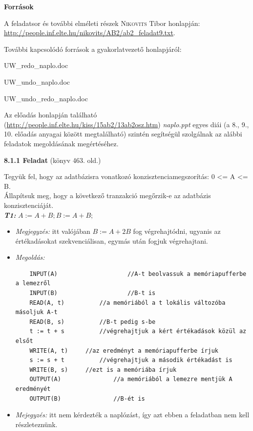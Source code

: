 \documentclass[a4paper,11.5pt, table]{article}
\begin{document}
	{\large \textbf{Források}}
	\begin{compactitem}
	\item A feladatsor és további elméleti részek \textsc{Nikovits} Tibor honlapján: \url{http://people.inf.elte.hu/nikovits/AB2/ab2_feladat9.txt}.
	
	\item További kapcsolódó források a gyakorlatvezető honlapjáról:
	\begin{compactitem}
		\item UW\_redo\_naplo.doc
		\item UW\_undo\_naplo.doc
		\item UW\_undo\_redo\_naplo.doc
	\end{compactitem}
	
	\item Az előadás honlapján található (\url{http://people.inf.elte.hu/kiss/15ab2/13ab2osz.htm}) \textit{naplo.ppt} egyes diái (a 8., 9., 10. előadás anyagai között megtalálható) szintén segítségül szolgálnak az alábbi feladatok megoldásának megértéséhez. 
	\end{compactitem}
	
	
	{\large \textbf{8.1.1 Feladat}} (könyv 463. old.)
	
	Tegyük fel, hogy az adatbázisra vonatkozó konzisztenciamegszorítás: 0 <= A <= B. \\
	Állapítsuk meg, hogy a következő tranzakció megőrzik-e az adatbázis konzisztenciáját.\\
	\textbf{\textit{T1:}} $ A := A + B; B := A + B;$
	\begin{itemize}
		\item \textit{Megjegyzés:} itt valójában $B := A + 2B$ fog végrehajtódni, ugyanis az értékadásokat szekvenciálisan, egymás után fogjuk végrehajtani. 
		
		\item \textit{Megoldás:}\\
		\begin{lstlisting}
	INPUT(A)					//A-t beolvassuk a memóriapufferbe a lemezről
	INPUT(B)					//B-t is
	READ(A, t)			//a memóriából a t lokális változóba másoljuk A-t
	READ(B, s)			//B-t pedig s-be
	t := t + s			//végrehajtjuk a kért értékadások közül az elsőt
	WRITE(A, t)		//az eredményt a memóriapufferbe írjuk 
	s := s + t			//végrehajtjuk a második értékadást is
	WRITE(B, s)		//ezt is a memóriába írjuk
	OUTPUT(A)				//a memóriából a lemezre mentjük A eredményét 
	OUTPUT(B)				//B-ét is
		\end{lstlisting}
		
		\item \textit{Mejegyzés:} itt nem kérdezték a naplózást, így azt ebben a feladatban nem kell részleteznünk.
	\end{itemize}
\end{document}
